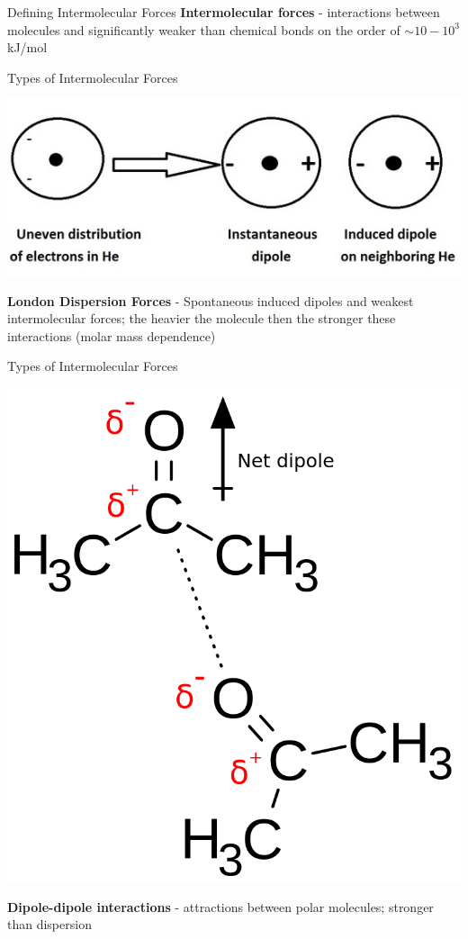 \documentclass[11pt]{beamer}
\begin{document}
\begin{frame}{Defining Intermolecular Forces}
  \textbf{Intermolecular forces} - interactions between molecules
  and significantly weaker than chemical bonds on the order of
  $\sim 10 - 10^3$ kJ/mol
\end{frame}

\begin{frame}{Types of Intermolecular Forces}
  \begin{center}
    \includegraphics[scale=0.45]{disp.jpg}
  \end{center}
  \textbf{London Dispersion Forces} - Spontaneous induced dipoles
  and weakest intermolecular forces; the heavier the molecule then
  the stronger these interactions (molar mass dependence)
\end{frame}

\begin{frame}{Types of Intermolecular Forces}
  \begin{center}
    \includegraphics[width=0.4\linewidth]{dipole_dipole}
  \end{center}
  \textbf{Dipole-dipole interactions} - attractions between polar
  molecules; stronger than dispersion
\end{frame}
\end{document}
